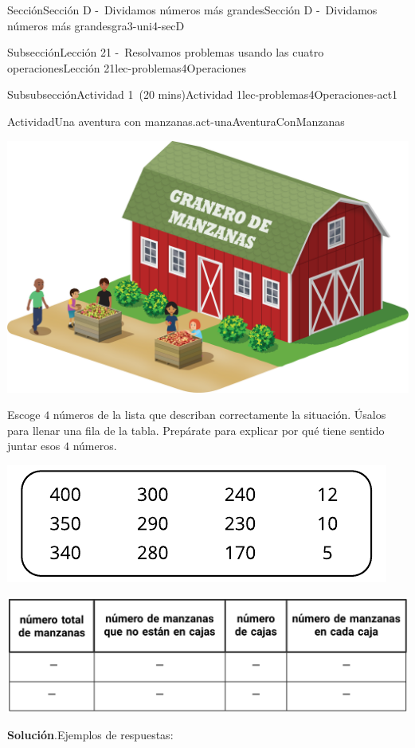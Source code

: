 \documentclass[oneside,10pt,]{article}
\newcommand{\blocktitlefont}{\relax}
\begin{document}
\begin{sectionptx}{Sección}{Sección D -~Dividamos números más grandes}{}{Sección D -~Dividamos números más grandes}{}{}{gra3-uni4-secD}
\begin{subsectionptx}{Subsección}{Lección 21 -~Resolvamos problemas usando las cuatro operaciones}{}{Lección 21}{}{}{lec-problemas4Operaciones}
\begin{subsubsectionptx}{Subsubsección}{Actividad 1~(20 mins)}{}{Actividad 1}{}{}{lec-problemas4Operaciones-act1}
\begin{activity}{Actividad}{Una aventura con manzanas.}{act-unaAventuraConManzanas}
\begin{sidebyside}{2}{0}{0}{0.1}
\begin{sbspanel}{0.3}
\includegraphics[width=\linewidth]{external/png-source/3.4.D21.S_Sp.png}
\end{sbspanel}%
\end{sidebyside}%
\par
Escoge \(4\) números de la lista que describan correctamente la situación. Úsalos para llenar una fila de la tabla. Prepárate para explicar por qué tiene sentido juntar esos \(4\) números.%
\begin{image}{0}{1}{0}{}%
\includegraphics[width=\linewidth]{external/svg-source/tikz-file-149345-scale13.pdf}
\end{image}%
\begin{image}{0}{1}{0}{}%
\includegraphics[width=\linewidth]{external/tikz-source/3-4-21-act1-tab-est-noLibroTrabajo.pdf}
\end{image}%
\par\smallskip%
\noindent\textbf{\blocktitlefont Solución}.\hypertarget{act-unaAventuraConManzanas-3}{}\quad{}Ejemplos de respuestas:%

\end{activity}
\end{subsubsectionptx}
\end{subsectionptx}
\end{sectionptx}
\end{document}
